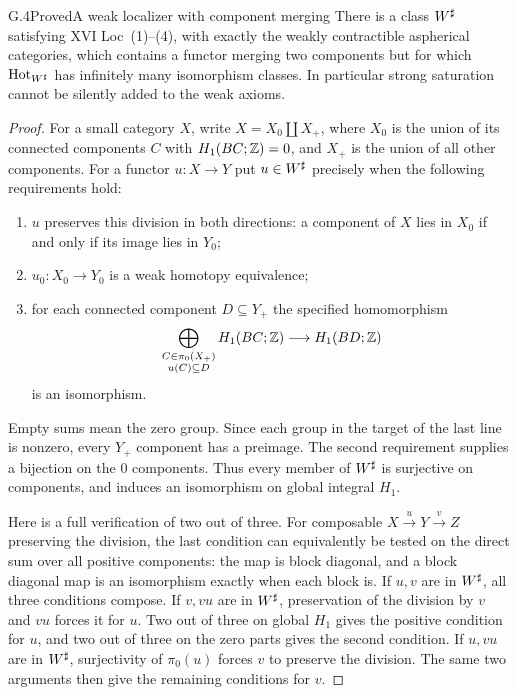 \begin{claim}{G.4}{Proved}{A weak localizer with component merging}
\label{G:Wsharp}
There is a class $W^{\sharp}$ satisfying XVI Loc~(1)--(4), with exactly
the weakly contractible aspherical categories, which contains a
functor merging two components but for which $\operatorname{Hot}_{W^{\sharp}}$ has
infinitely many isomorphism classes.  In particular strong saturation
cannot be silently added to the weak axioms.
\end{claim}
\begin{proof}
For a small category $X$, write $X=X_0\amalg X_+$, where $X_0$ is the
union of its connected components $C$ with $H_1(BC;\mathbb Z)=0$, and $X_+$
is the union of all other components.  For a functor $u:X\to Y$ put
$u\in W^{\sharp}$ precisely when the following requirements hold:
\begin{enumerate}
\item $u$ preserves this division in both directions: a component of
$X$ lies in $X_0$ if and only if its image lies in $Y_0$;
\item $u_0:X_0\to Y_0$ is a weak homotopy equivalence;
\item for each connected component $D\subseteq Y_+$ the specified
homomorphism
\[
 \bigoplus_{\substack{C\in\pi_0(X_+)\\u(C)\subseteq D}}
 H_1(BC;\mathbb Z)\longrightarrow H_1(BD;\mathbb Z)
\]
is an isomorphism.
\end{enumerate}
Empty sums mean the zero group.  Since each group in the target of
the last line is nonzero, every $Y_+$ component has a preimage.
The second requirement supplies a bijection on the $0$ components.
Thus every member of $W^{\sharp}$ is surjective on components, and
induces an isomorphism on global integral $H_1$.

Here is a full verification of two out of three.  For composable
$X\xrightarrow{u}Y\xrightarrow{v}Z$ preserving the division,
the last condition can equivalently be tested on the direct sum over
all positive components: the map is block diagonal, and a block
diagonal map is an isomorphism exactly when each block is.  If $u,v$
are in $W^{\sharp}$, all three conditions compose.  If $v,vu$ are in
$W^{\sharp}$, preservation of the division by $v$ and $vu$ forces it
for $u$.  Two out of three on global $H_1$ gives the positive condition
for $u$, and two out of three on the zero parts gives the second
condition.  If $u,vu$ are in $W^{\sharp}$, surjectivity of $\pi_0(u)$
forces $v$ to preserve the division.  The same two arguments then
give the remaining conditions for $v$.


\end{proof}
